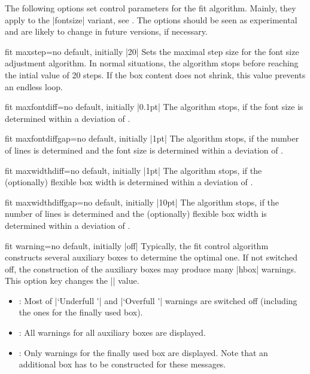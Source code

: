 \clearpage
\begin{marker}
The following options set control parameters for the fit algorithm.
Mainly, they apply to the |fontsize| variant, see .
The options should be seen as experimental and are likely to change in future versions,
if necessary.
\end{marker}

\begin{docTcbKey}{fit maxstep}{=}{no default, initially |20|}
  Sets the maximal step size for the font size adjustment algorithm.
  In normal situations, the algorithm stops before reaching the intial value of 20 steps.
  If the box content does not shrink, this value prevents an endless loop.
\end{docTcbKey}


\begin{docTcbKey}{fit maxfontdiff}{=}{no default, initially |0.1pt|}
  The algorithm stops, if the font size is determined within a deviation of
  .
\end{docTcbKey}


\begin{docTcbKey}{fit maxfontdiffgap}{=}{no default, initially |1pt|}
  The algorithm stops, if the number of lines is determined and the font size is
  determined within a deviation of .
\end{docTcbKey}


\begin{docTcbKey}{fit maxwidthdiff}{=}{no default, initially |1pt|}
  The algorithm stops, if the (optionally) flexible box width
  is determined within a deviation of .
\end{docTcbKey}


\begin{docTcbKey}{fit maxwidthdiffgap}{=}{no default, initially |10pt|}
  The algorithm stops, if the number of lines is determined and the (optionally) flexible box width
  is determined within a deviation of .
\end{docTcbKey}


\begin{docTcbKey}{fit warning}{=}{no default, initially |off|}
  Typically, the fit control algorithm constructs several auxiliary boxes
  to determine the optimal one. If not switched off, the construction of
  the auxiliary boxes may produce many |hbox| warnings. This option key
  changes the |\hbadness| value.
  \begin{itemize}
  \item{}: Most of |`Underfull \hbox'| and |`Overfull \hbox'| warnings are
    switched off (including the ones for the finally used box).
  \item{}: All warnings for all auxiliary boxes are displayed.
  \item{}: Only warnings for the finally used box are displayed.
    Note that an additional box has to be constructed for these messages.
  \end{itemize}
\end{docTcbKey}

